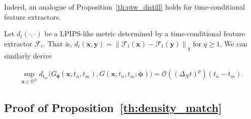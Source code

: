 \documentclass{article} \usepackage{iclr2024_coNFErence,times}
\newcommand{\norm}[1]{\left\lVert#1\right\rVert}
\theoremstyle{definition}
\theoremstyle{remark}
\begin{document}
Indeed, an analogue of Proposition~\ref{th:ptw_distill} holds for time-conditional feature extractors.

Let $d_{t}(\cdot, \cdot)$ be a LPIPS-like metric determined by a time-conditional feature extractor $\mathcal{F}_{t}$. That is, $d_{t}(\mathbf{x}, \mathbf{y})=\norm{\mathcal{F}_{t}(\mathbf{x})-\mathcal{F}_{t}(\mathbf{y})}_{q}$ for $q\geq1$. We can similarly derive

\begin{align*}
    \sup_{\mathbf{x}\in\mathbb{R}^D} d_{t_m}\big(G_{\bm{\theta}}(\mathbf{x}, t_n, t_m) ,G(\mathbf{x}, t_n, t_m; \bm{\phi})\big) = \mathcal{O}((\Delta_N t)^{p})(t_n - t_m).
\end{align*}





\subsection{Proof of Proposition~\ref{th:density_match}}
\end{document}
